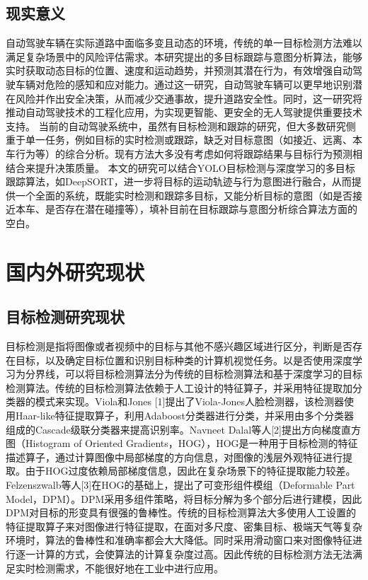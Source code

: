 \subsection{现实意义}

自动驾驶车辆在实际道路中面临多变且动态的环境，传统的单一目标检测方法难以满足复杂场景中的风险评估需求。本研究提出的多目标跟踪与意图分析算法，能够实时获取动态目标的位置、速度和运动趋势，并预测其潜在行为，有效增强自动驾驶车辆对危险的感知和应对能力。通过这一研究，自动驾驶车辆可以更早地识别潜在风险并作出安全决策，从而减少交通事故，提升道路安全性。同时，这一研究将推动自动驾驶技术的工程化应用，为实现更智能、更安全的无人驾驶提供重要技术支持。
当前的自动驾驶系统中，虽然有目标检测和跟踪的研究，但大多数研究侧重于单一任务，例如目标的实时检测或跟踪，缺乏对目标意图（如接近、远离、本车行为等）的综合分析。现有方法大多没有考虑如何将跟踪结果与目标行为预测相结合来提升决策质量。
本文的研究可以结合YOLO目标检测与深度学习的多目标跟踪算法，如DeepSORT，进一步将目标的运动轨迹与行为意图进行融合，从而提供一个全面的系统，既能实时检测和跟踪多目标，又能分析目标的意图（如是否接近本车、是否存在潜在碰撞等），填补目前在目标跟踪与意图分析综合算法方面的空白。

\section{国内外研究现状}

\subsection{目标检测研究现状}

目标检测是指将图像或者视频中的目标与其他不感兴趣区域进行区分，判断是否存在目标，以及确定目标位置和识别目标种类的计算机视觉任务。以是否使用深度学习为分界线，可以将目标检测算法分为传统的目标检测算法和基于深度学习的目标检测算法。传统的目标检测算法依赖于人工设计的特征算子，并采用特征提取加分类器的模式来实现。Viola和Jones [1]提出了Viola-Jones人脸检测器，该检测器使用Haar-like特征提取算子，利用Adaboost分类器进行分类，并采用由多个分类器组成的Cascade级联分类器来提高识别率。Navneet Dalal等人[2]提出方向梯度直方图（Histogram of Oriented Gradients，HOG），HOG是一种用于目标检测的特征描述算子，通过计算图像中局部梯度的方向信息，对图像的浅层外观特征进行提取。由于HOG过度依赖局部梯度信息，因此在复杂场景下的特征提取能力较差。Felzenszwalb等人[3]在HOG的基础上，提出了可变形组件模组（Deformable Part Model，DPM）。DPM采用多组件策略，将目标分解为多个部分后进行建模，因此DPM对目标的形变具有很强的鲁棒性。传统的目标检测算法大多使用人工设置的特征提取算子来对图像进行特征提取，在面对多尺度、密集目标、极端天气等复杂环境时，算法的鲁棒性和准确率都会大大降低。同时采用滑动窗口来对图像特征进行逐一计算的方式，会使算法的计算复杂度过高。因此传统的目标检测方法无法满足实时检测需求，不能很好地在工业中进行应用。

